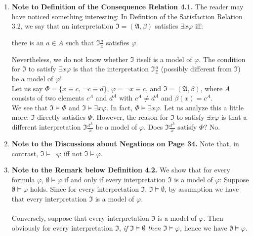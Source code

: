 \begin{enumerate}[1.]
\item \textbf{Note to Definition of the Consequence Relation 4.1.} The reader may have noticed something interesting: In Defintion of the Satisfaction Relation 3.2, we say that an interpretation $\mathfrak{I} = (\mathfrak{A}, \beta)$ satisfies $\exists x \varphi$ iff:
\begin{center}
there is an $a \in A$ such that $\mathfrak{I}\frac{a}{x}$ satisfies $\varphi$.
\end{center}
Nevertheless, we do not know whether $\mathfrak{I}$ itself is a model of $\varphi$. The condition for $\mathfrak{I}$ to satisfy $\exists x \varphi$ is that the interpretation $\mathfrak{I}\frac{a}{x}$ (possibly different from $\mathfrak{I}$) be a model of $\varphi$!\newline
\\
Let us say $\Phi = \{x \equiv c, \ \neg c \equiv d \}$, $\varphi = \neg x \equiv c$, and $\mathfrak{I} = (\mathfrak{A}, \beta)$, where $A$ consists of two elements $c^A$ and $d^A$ with $c^A \neq d^A$ and $\beta(x) = c^A$.\newline
\\
We see that $\mathfrak{I} \models \Phi$ and $\mathfrak{I} \models \exists x \varphi$. In fact, $\Phi \models \exists x \varphi$. Let us analyze this a little more: $\mathfrak{I}$ directly satisfies $\Phi$. However, the reason for $\mathfrak{I}$ to satisfy $\exists x \varphi$ is that a different interpretation $\mathfrak{I}\frac{d^A}{x}$ be a model of $\varphi$. Does $\mathfrak{I}\frac{d^A}{x}$ satisfy $\Phi$? No.
%
\item \textbf{Note to the Discussions about Negations on Page 34.} Note that, in contrast, $\mathfrak{I} \models \neg \varphi$ iff not $\mathfrak{I} \models \varphi$.
%
\item \textbf{Note to the Remark below Definition 4.2.} We show that for every formula $\varphi$, $\emptyset \models \varphi$ if and only if every interpretation $\mathfrak{I}$ is a model of $\varphi$: Suppose $\emptyset \models \varphi$ holds. Since for every interpretation $\mathfrak{I}$, $\mathfrak{I} \models \emptyset$, by assumption we have that every interpretation $\mathfrak{I}$ is a model of $\varphi$.\\
\ \\
Conversely, suppose that every interpretation $\mathfrak{I}$ is a model of $\varphi$. Then obviously for every interpretation $\mathfrak{I}$, \emph{if $\mathfrak{I} \models \emptyset$ then $\mathfrak{I} \models \varphi$,} hence we have $\emptyset \models \varphi$.

\end{enumerate}

